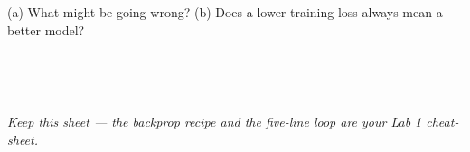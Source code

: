 \documentclass[11pt]{article}
\newif\ifsolution
\newcommand{\blk}[1]{\underline{\hspace{#1}}}
\newcommand{\keybox}[1]{\ifsolution\par\vspace{2pt}%
  \fbox{\parbox{0.965\textwidth}{\small\textbf{Answer.}\; #1}}\par\fi}
\newcommand{\work}[1]{\ifsolution\else\vspace{#1}\fi}
\begin{document}
\vspace{4pt}
(a) What might be going wrong? \hfill (b) Does a lower training loss always mean a better model?

\work{1.6cm}
\ifsolution\else\blk{\linewidth}\\[10pt]\blk{\linewidth}\\[10pt]\blk{\linewidth}\fi

\keybox{(a) This is \textbf{overfitting}: the network is starting to \emph{memorise} the quirks and
noise of the training set instead of learning the general pattern, so it keeps improving on seen
data while getting worse on new data. (b) \textbf{No.} A lower \emph{training} loss does not mean a
better model --- what matters is performance on \emph{unseen} data (generalisation); once the two
curves split apart, more training makes the model worse in practice. (Lecture 4 names the fixes:
more/cleaner data, regularisation, dropout, and early stopping --- stop where the held-out loss
turns up.)}

\vspace{4pt}\hrule\vspace{3pt}
{\small\itshape \ifsolution Answer key.\else Keep this sheet --- the backprop recipe and the
five-line loop are your Lab 1 cheat-sheet.\fi}
\end{document}
